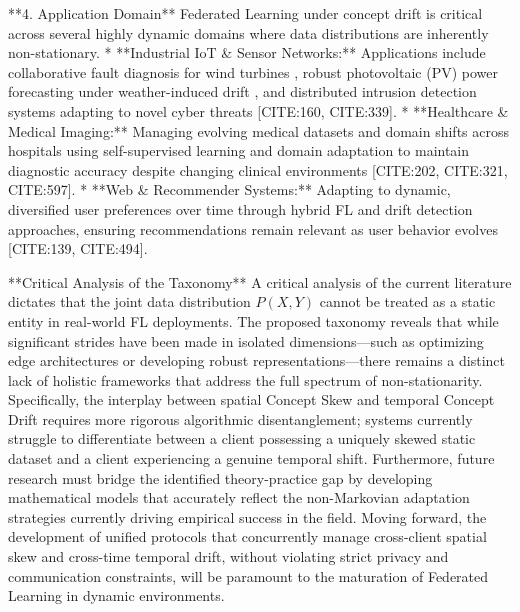 \documentclass[journal]{IEEEtran}
\begin{document}
**4. Application Domain**
Federated Learning under concept drift is critical across several highly dynamic domains where data distributions are inherently non-stationary.
*   **Industrial IoT \& Sensor Networks:** Applications include collaborative fault diagnosis for wind turbines \cite{Jiang2024}, robust photovoltaic (PV) power forecasting under weather-induced drift \cite{Moayyed2025}, and distributed intrusion detection systems adapting to novel cyber threats [CITE:160, CITE:339].
*   **Healthcare \& Medical Imaging:** Managing evolving medical datasets and domain shifts across hospitals using self-supervised learning and domain adaptation to maintain diagnostic accuracy despite changing clinical environments [CITE:202, CITE:321, CITE:597].
*   **Web \& Recommender Systems:** Adapting to dynamic, diversified user preferences over time through hybrid FL and drift detection approaches, ensuring recommendations remain relevant as user behavior evolves [CITE:139, CITE:494].

**Critical Analysis of the Taxonomy**
A critical analysis of the current literature dictates that the joint data distribution $P(X, Y)$ cannot be treated as a static entity in real-world FL deployments. The proposed taxonomy reveals that while significant strides have been made in isolated dimensions—such as optimizing edge architectures or developing robust representations—there remains a distinct lack of holistic frameworks that address the full spectrum of non-stationarity. Specifically, the interplay between spatial Concept Skew and temporal Concept Drift requires more rigorous algorithmic disentanglement; systems currently struggle to differentiate between a client possessing a uniquely skewed static dataset and a client experiencing a genuine temporal shift. Furthermore, future research must bridge the identified theory-practice gap by developing mathematical models that accurately reflect the non-Markovian adaptation strategies currently driving empirical success in the field. Moving forward, the development of unified protocols that concurrently manage cross-client spatial skew and cross-time temporal drift, without violating strict privacy and communication constraints, will be paramount to the maturation of Federated Learning in dynamic environments.
\end{document}
